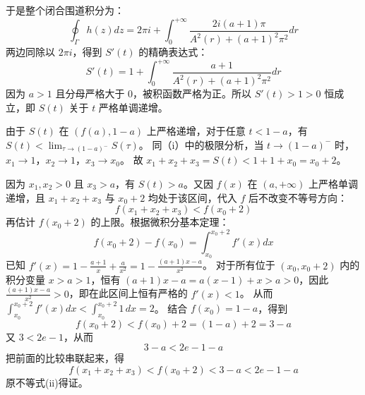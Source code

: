 \begin{solution}
于是整个闭合围道积分为：
$$\oint_\Gamma h(z)dz = 2\pi i + \int_0^{+\infty}\frac{2i(a+1)\pi}{A^2(r)+(a+1)^2\pi^2}dr$$
两边同除以 $2\pi i$，得到 $S'(t)$ 的精确表达式：
$$S'(t) = 1 + \int_0^{+\infty}\frac{a+1}{A^2(r)+(a+1)^2\pi^2}dr$$
因为 $a>1$ 且分母严格大于 0，被积函数严格为正。所以 $S'(t) > 1 > 0$ 恒成立，即 $S(t)$ 关于 $t$ 严格单调递增。

由于 $S(t)$ 在 $(f(a),1-a)$ 上严格递增，对于任意 $t<1-a$，有 $S(t) < \lim_{\tau\to (1-a)^-}S(\tau)$。
同（i）中的极限分析，当 $t\to (1-a)^-$ 时，$x_1\to 1$，$x_2\to 1$，$x_3\to x_0$。
故 $x_1+x_2+x_3 = S(t) < 1+1+x_0 = x_0+2$。

因为 $x_1, x_2 > 0$ 且 $x_3 > a$，有 $S(t) > a$。又因 $f(x)$ 在 $(a,+\infty)$ 上严格单调递增，且 $x_1+x_2+x_3$ 与 $x_0+2$ 均处于该区间，代入 $f$ 后不改变不等号方向：
$$f(x_1+x_2+x_3) < f(x_0+2)$$
再估计 $f(x_0+2)$ 的上限。根据微积分基本定理：
$$f(x_0+2) - f(x_0) = \int_{x_0}^{x_0+2} f'(x) dx$$
已知 $f'(x) = 1 - \frac{a+1}{x} + \frac{a}{x^2} = 1 - \frac{(a+1)x-a}{x^2}$。
对于所有位于 $(x_0, x_0+2)$ 内的积分变量 $x > a > 1$，恒有 $(a+1)x - a = a(x-1) + x > a > 0$，因此 $\frac{(a+1)x-a}{x^2} > 0$，即在此区间上恒有严格的 $f'(x) < 1$。
从而 $\int_{x_0}^{x_0+2} f'(x) dx < \int_{x_0}^{x_0+2} 1 \,dx = 2$。
结合 $f(x_0) = 1-a$，得到
$$f(x_0+2) < f(x_0) + 2 = (1-a) + 2 = 3-a$$
又 \(3<2e-1\)，从而
$$3-a < 2e-1-a$$
把前面的比较串联起来，得
$$f(x_1+x_2+x_3) < f(x_0+2) < 3-a < 2e-1-a$$
原不等式(ii)得证。
\end{solution}

